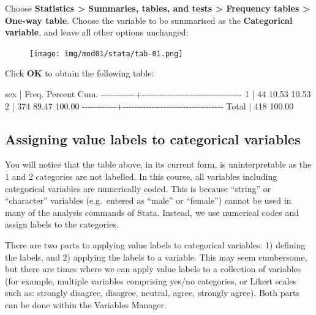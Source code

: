 \documentclass[
  a4paper,
]{memoir}
\newenvironment{Shaded}{\begin{snugshade}}{\end{snugshade}}
\newcommand{\DecValTok}[1]{\textcolor[rgb]{0.00,0.00,0.00}{#1}}
\newcommand{\FloatTok}[1]{\textcolor[rgb]{0.00,0.00,0.00}{#1}}
\newcommand{\NormalTok}[1]{\textcolor[rgb]{0.00,0.00,0.00}{#1}}
\newcommand{\SpecialCharTok}[1]{\textcolor[rgb]{0.00,0.00,0.00}{#1}}
\begin{document}
Choose \textbf{Statistics \textgreater{} Summaries, tables, and tests
\textgreater{} Frequency tables \textgreater{} One-way table}. Choose
the variable to be summarised as the \textbf{Categorical variable}, and
leave all other options unchanged:

\begin{figure}[H]

{\centering \texttt{[image: img/mod01/stata/tab-01.png]}

}

\end{figure}

Click \textbf{OK} to obtain the following table:

\begin{Shaded}
\begin{Highlighting}[]
\NormalTok{        sex }\SpecialCharTok{|}\NormalTok{      Freq.     Percent        Cum.}
\SpecialCharTok{{-}{-}{-}{-}{-}{-}{-}{-}{-}{-}{-}{-}+{-}{-}{-}{-}{-}{-}{-}{-}{-}{-}{-}{-}{-}{-}{-}{-}{-}{-}{-}{-}{-}{-}{-}{-}{-}{-}{-}{-}{-}{-}{-}{-}{-}{-}{-}}
          \DecValTok{1} \SpecialCharTok{|}         \DecValTok{44}       \FloatTok{10.53}       \FloatTok{10.53}
          \DecValTok{2} \SpecialCharTok{|}        \DecValTok{374}       \FloatTok{89.47}      \FloatTok{100.00}
\SpecialCharTok{{-}{-}{-}{-}{-}{-}{-}{-}{-}{-}{-}{-}+{-}{-}{-}{-}{-}{-}{-}{-}{-}{-}{-}{-}{-}{-}{-}{-}{-}{-}{-}{-}{-}{-}{-}{-}{-}{-}{-}{-}{-}{-}{-}{-}{-}{-}{-}}
\NormalTok{      Total }\SpecialCharTok{|}        \DecValTok{418}      \FloatTok{100.00}
\end{Highlighting}
\end{Shaded}

\hypertarget{assigning-value-labels-to-categorical-variables}{%
\subsection{Assigning value labels to categorical
variables}\label{assigning-value-labels-to-categorical-variables}}

You will notice that the table above, in its current form, is
uninterpretable as the 1 and 2 categories are not labelled. In this
course, all variables including categorical variables are numerically
coded. This is because ``string'' or ``character'' variables
(e.g.~entered as ``male'' or ``female'') cannot be used in many of the
analysis commands of Stata. Instead, we use numerical codes and assign
labels to the categories.

There are two parts to applying value labels to categorical variables:
1) defining the labels, and 2) applying the labels to a variable. This
may seem cumbersome, but there are times where we can apply value labels
to a collection of variables (for example, multiple variables comprising
yes/no categories, or Likert scales such as: strongly disagree,
disagree, neutral, agree, strongly agree). Both parts can be done within
the Variables Manager.
\end{document}
